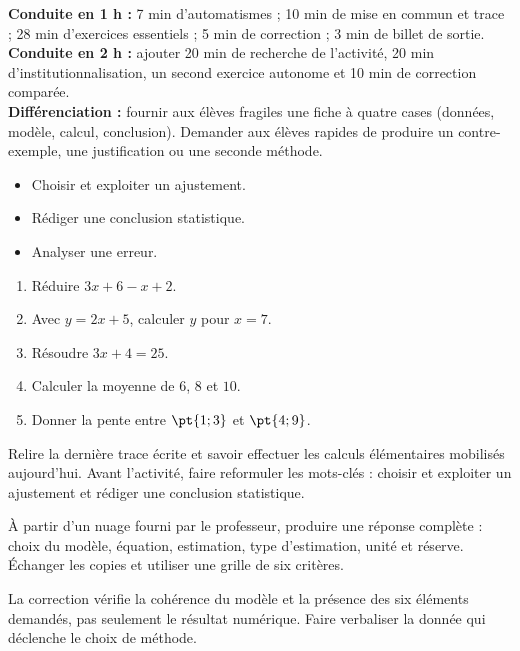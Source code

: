 \ifmxteacher
\begin{method}
\textbf{Conduite en 1 h :} 7 min d'automatismes ; 10 min de mise en commun et trace ; 28 min d'exercices essentiels ; 5 min de correction ; 3 min de billet de sortie.\\
\textbf{Conduite en 2 h :} ajouter 20 min de recherche de l'activité, 20 min d'institutionnalisation, un second exercice autonome et 10 min de correction comparée.\\
\textbf{Différenciation :} fournir aux élèves fragiles une fiche à quatre cases (données, modèle, calcul, conclusion). Demander aux élèves rapides de produire un contre-exemple, une justification ou une seconde méthode.
\end{method}
\fi
{}
\begin{objectives}\begin{itemize}\item Choisir et exploiter un ajustement.\item Rédiger une conclusion statistique.\item Analyser une erreur.\end{itemize}\end{objectives}
\begin{fluency}\begin{enumerate}\item Réduire $3x+6-x+2$. \item Avec $y=2x+5$, calculer $y$ pour $x=7$. \item Résoudre $3x+4=25$. \item Calculer la moyenne de $6$, $8$ et $10$. \item Donner la pente entre $\pt{1;3}$ et $\pt{4;9}$. \end{enumerate}\end{fluency}
\begin{prerequisites}Relire la dernière trace écrite et savoir effectuer les calculs élémentaires mobilisés aujourd'hui. Avant l'activité, faire reformuler les mots-clés : choisir et exploiter un ajustement et rédiger une conclusion statistique.\end{prerequisites}

\begin{activity}
À partir d'un nuage fourni par le professeur, produire une réponse complète : choix du modèle, équation, estimation, type d'estimation, unité et réserve. Échanger les copies et utiliser une grille de six critères.

\end{activity}
\begin{solution}La correction vérifie la cohérence du modèle et la présence des six éléments demandés, pas seulement le résultat numérique. Faire verbaliser la donnée qui déclenche le choix de méthode.\end{solution}

